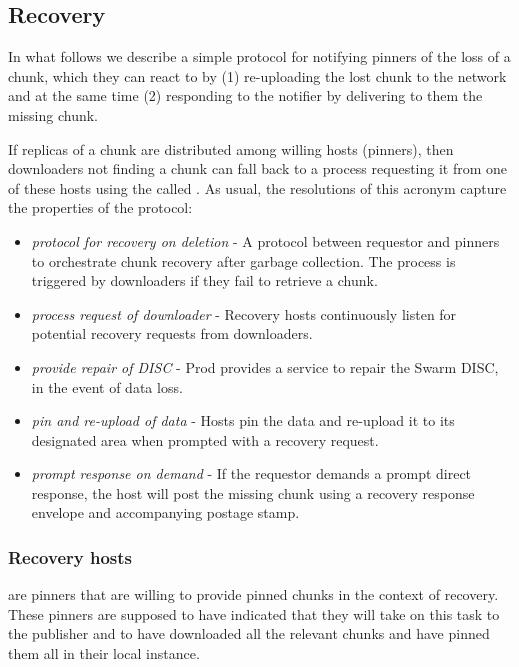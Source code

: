 \subsection{Recovery \statusyellow}\label{sec:recovery-chunks}


In what follows we describe a simple protocol for notifying pinners of the loss of a chunk, which they can react to by (1) re-uploading the lost chunk to the network and at the same time (2) responding to the notifier by delivering to them the missing chunk. 

If replicas of a chunk are distributed among willing hosts (pinners), then downloaders not finding a chunk can fall back to a  process requesting it from one of these hosts using the  called .
As usual, the resolutions of this acronym capture the properties of the protocol:

\begin{itemize}[noitemsep]
\item \emph{protocol for recovery on deletion} - A protocol between requestor and pinners to orchestrate chunk recovery after garbage collection. The process is triggered by downloaders if they fail to retrieve a chunk.
\item \emph{process request of downloader} - Recovery hosts continuously listen for potential recovery requests from downloaders.
\item \emph{provide repair of DISC} - 
Prod provides a service to repair the Swarm DISC, in the event of data loss.
\item \emph{pin and re-upload of data} -     
Hosts pin the data and re-upload it to its designated area when prompted with a recovery request. 
\item \emph{prompt response on demand}  - If the requestor demands a prompt direct response, the host will post the missing chunk using a recovery response envelope and accompanying postage stamp.
\end{itemize}

\subsubsection{Recovery hosts}

 are pinners that are willing to provide pinned chunks in the context of recovery. These pinners are supposed to have indicated that they will take on this task to the publisher and to have downloaded all the relevant chunks and have pinned them all in their local instance. 


